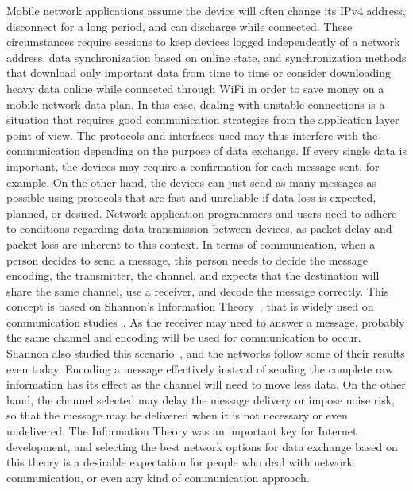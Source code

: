 Mobile network applications assume the device will often change its IPv4 address, disconnect for a long period, and can discharge while connected.
These circumstances require sessions to keep devices logged independently of a network address, data synchronization based on online state, and synchronization methods that download only important data from time to time or consider downloading heavy data online while connected through WiFi in order to save money on a mobile network data plan.
In this case, dealing with unstable connections is a situation that requires good communication strategies from the application layer point of view.
The protocols and interfaces used may thus interfere with the communication depending on the purpose of data exchange.
If every single data is important, the devices may require a confirmation for each message sent, for example.
On the other hand, the devices can just send as many messages as possible using protocols that are fast and unreliable if data loss is expected, planned, or desired.
Network application programmers and users need to adhere to conditions regarding data transmission between devices, as packet delay and packet loss are inherent to this context.
In terms of communication, when a person decides to send a message, this person needs to decide the message encoding, the transmitter, the channel, and expects that the destination will share the same channel, use a receiver, and decode the message correctly.
This concept is based on Shannon's Information Theory~\citep{Shannon1948mathematical}, that is widely used on communication studies~\citep{Fiske2010introduction}.
As the receiver may need to answer a message, probably the same channel and encoding will be used for communication to occur.
Shannon also studied this scenario~\citep{Shannon1961two}, and the networks follow some of their results even today.
Encoding a message effectively instead of sending the complete raw information has its effect as the channel will need to move less data.
On the other hand, the channel selected may delay the message delivery or impose noise risk, so that the message may be delivered when it is not necessary or even undelivered.
The Information Theory was an important key for Internet development, and selecting the best network options for data exchange based on this theory is a desirable expectation for people who deal with network communication, or even any kind of communication approach.

